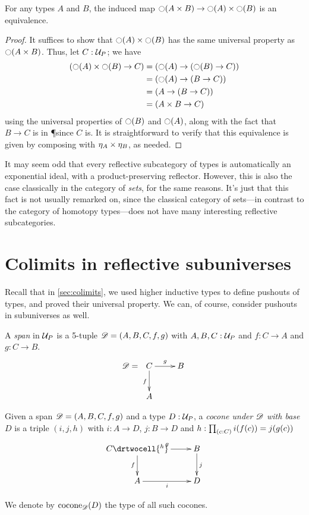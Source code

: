 \begin{cor}\label{cor:trunc_prod}
  For any types $A$ and $B$, the induced map $\reflect(A\times B) \to \reflect(A) \times \reflect(B)$ is an equivalence.
\end{cor}
\begin{proof}
  It suffices to show that $\reflect(A) \times \reflect(B)$ has the same universal property as $\reflect(A\times B)$.
  Thus, let $C:\P$; we have
  \begin{align*}
    (\reflect(A) \times \reflect(B) \to C)
    &= (\reflect(A) \to (\reflect(B) \to C))\\
    &= (\reflect(A) \to (B \to C))\\
    &= (A \to (B \to C))\\
    &= (A \times B \to C)
  \end{align*}
  using the universal properties  of $\reflect(B)$ and $\reflect(A)$, along with the fact that $B\to C$ is in \P since $C$ is.
  It is straightforward to verify that this equivalence is given by composing with $\mreturn_A \times \mreturn_B$, as needed.
\end{proof}

It may seem odd that every reflective subcategory of types is automatically an exponential ideal, with a product-preserving reflector.
However, this is also the case classically in the category of \emph{sets}, for the same reasons.
It's just that this fact is not usually remarked on, since the classical category of sets---in contrast to the category of homotopy
types---does not have many interesting reflective subcategories.


\section{Colimits in reflective subuniverses}
\label{sec:pushouts}

Recall that in \autoref{sec:colimits}, we used higher inductive types to define pushouts of types, and proved their universal property.
We can, of course, consider pushouts in subuniverses as well.

\begin{defn}
  A \emph{span} in $\P$ is a 5-tuple $\Ddiag=(A,B,C,f,g)$ with
  $A,B,C:\P$ and $f:C\to{}A$ and $g:C\to{}B$.
  \[\Ddiag=\xymatrix{C \ar^g[r] \ar_f[d] & B \\ A & }\]
\end{defn}

\begin{defn}
  Given a span $\Ddiag=(A,B,C,f,g)$ and a type $D:\P$, a
  \emph{cocone under $\Ddiag$ with base $D$} is a triple $(i, j, h)$ with
  $i:A\to{}D$, $j:B\to{}D$ and $h : \prd{c:C}i(f(c))=j(g(c))$
  \[\uppercurveobject{{ }}\lowercurveobject{{ }}\twocellhead{{ }}
  \xymatrix{C \ar^g[r] \ar_f[d] \drtwocell{^h} & B \ar^j[d] \\ A \ar_i[r] & D
  }\]

  We denote by $\cocone{\Ddiag}{D}$ the type of all such cocones.
\end{defn}

